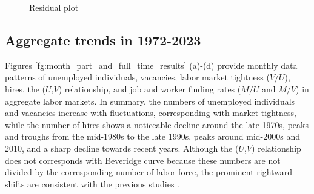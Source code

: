 \documentclass[12pt]{article}
\begin{document}
\begin{figure}[!ht]
  \begin{center}
  \caption{Residual plot}
  \label{fg:residual_plots} 
  \end{center}
  \footnotesize
\end{figure} 


\subsection{Aggregate trends in 1972-2023}\label{sec:month_level}

Figures \ref{fg:month_part_and_full_time_results} (a)-(d) provide monthly data patterns of unemployed individuals, vacancies, labor market tightness (\(V/U\)), hires, the  ($U$,$V$) relationship, and job and worker finding rates (\(M/U\) and \(M/V\)) in aggregate labor markets. 
In summary, the numbers of unemployed individuals and vacancies increase with fluctuations, corresponding with market tightness, while the number of hires shows a noticeable decline around the late 1970s, peaks and troughs from the mid-1980s to the late 1990s, peaks around mid-2000s and 2010, and a sharp decline towards recent years.
Although the ($U$,$V$) relationship does not corresponds with Beveridge curve because these numbers are not divided by the corresponding number of labor force, the prominent rightward shifts are consistent with the previous studies \citep{elsby2015beveridge}.
\end{document}
